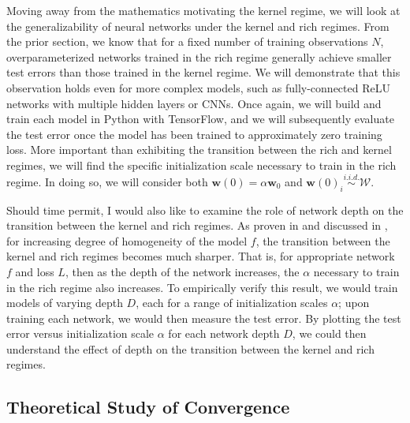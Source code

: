 \documentclass{article}
\begin{document}
Moving away from the mathematics motivating the kernel regime, we will look at the generalizability of neural networks under the kernel and rich regimes. From the prior section, we know that for a fixed number of training observations $N$, overparameterized networks trained in the rich regime generally achieve smaller test errors than those trained in the kernel regime. We will demonstrate that this observation holds even for more complex models, such as fully-connected ReLU networks with multiple hidden layers or CNNs. Once again, we will build and train each model in Python with TensorFlow, and we will subsequently evaluate the test error once the model has been trained to approximately zero training loss. More important than exhibiting the transition between the rich and kernel regimes, we will find the specific initialization scale necessary to train in the rich regime. In doing so, we will consider both $\boldsymbol{w}(0) = \alpha \boldsymbol{w}_0$ and $\boldsymbol{w}(0)_i \overset{i.i.d.}{\sim} \mathcal{W}$.

Should time permit, I would also like to examine the role of network depth on the transition between the kernel and rich regimes. As proven in \cite{arora2019implicit} and discussed in \cite{woodworth2020kernel}, for increasing degree of homogeneity of the model $f$, the transition between the kernel and rich regimes becomes much sharper. That is, for appropriate network $f$ and loss $L$, then as the depth of the network increases, the $\alpha$ necessary to train in the rich regime also increases. To empirically verify this result, we would train models of varying depth $D$, each for a range of initialization scales $\alpha$; upon training each network, we would then measure the test error. By plotting the test error versus initialization scale $\alpha$ for each network depth $D$, we could then understand the effect of depth on the transition between the kernel and rich regimes. 

\subsection{Theoretical Study of Convergence}
\end{document}
